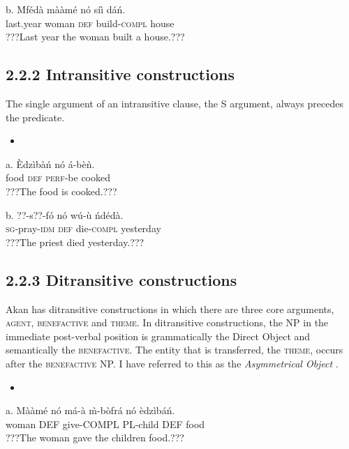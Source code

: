 \documentclass[output=paper]{langsci/langscibook}
\begin{document}
\gll  b.  \'{M}f\'{e}d\`{a}    m\`{a}\`{a}m\'{e}    n\'{o}  s\'{i}\`{i}    d\'{a}\'{n}.\\
       last.year  woman    \textsc{def}  build-\textsc{compl}  house\\
\glt   ???Last year the woman built a house.???
\z

\subsection{2.2.2  Intransitive constructions}

The single argument of an intransitive clause, the S argument, always precedes the predicate. 

\begin{itemize}
\item \end{itemize}
\gll a.  \`{E}dz\`{i}b\`{a}\'{n}  n\'{o}  \'{a}-b\`{e}\`{n}.  \\
       food    \textsc{def}  \textsc{perf}{}-be cooked\\
\glt   ???The food is cooked.???  
\z

\gll  b.  ??{}-s??-f\'{o}      n\'{o}  w\'{u}-\`{u}    \'{n}d\'{e}d\`{a}.\\
       \textsc{sg}{}-pray-\textsc{idm}    \textsc{def}  die-\textsc{compl}  yesterday\\
\glt   ???The priest died yesterday.???
\z

\subsection{2.2.3  Ditransitive constructions}

Akan has ditransitive constructions in which there are three core arguments, \textsc{agent, benefactive} and \textsc{theme}. In ditransitive constructions, the NP in the immediate post-verbal position is grammatically the Direct Object and semantically the \textsc{benefactive}. The entity that is transferred, the \textsc{theme}, occurs after the \textsc{benefactive} NP. I have referred to this as the \emph{Asymmetrical Object} \citep{Osam2000}.

\begin{itemize}
\item \end{itemize}
\gll a.  M\`{a}\`{a}m\'{e}    n\'{o}  m\'{a}-\`{a}    \`{m}-b\`{o}fr\'{a}  n\'{o}  \`{e}dz\`{i}b\'{a}\'{n}.\\
       woman    DEF  give-COMPL  PL-child  DEF  food\\
\glt   ???The woman gave the children food.???
\z
\end{document}
